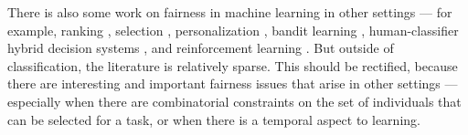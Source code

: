 There is also some work on fairness in machine learning in other settings --- for example, ranking \cite{YS17,CSV17}, selection \cite{selection,KR18}, personalization \cite{celis2017fair}, bandit learning \cite{infinitebandit,calibratedbandit}, human-classifier hybrid decision systems \cite{defer}, and reinforcement learning \cite{JJKMR17,DTB17}. But outside of classification, the literature is relatively sparse. This should be rectified, because there are interesting and important fairness issues that arise in other settings --- especially when there are combinatorial constraints on the set of individuals that can be selected for a task, or when there is a temporal aspect to learning.

